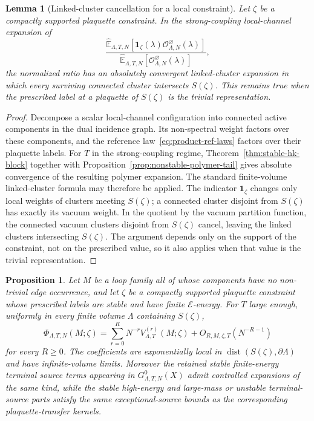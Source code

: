 \documentclass[11pt,a4paper,reqno]{amsart}
\newtheorem{lemma}[theorem]{Lemma}
\newtheorem{proposition}[theorem]{Proposition}
\theoremstyle{definition}
\theoremstyle{remark}
\newcommand\E{{\mathbb E}}
\begin{document}
\begin{lemma}[Linked-cluster cancellation for a local constraint]\label{lem:constraint-component-cancellation}
Let $\zeta$ be a compactly supported plaquette constraint. In the strong-coupling local-channel expansion of
\[
\frac{\widehat\E_{\Lambda,T,N}[\mathbf 1_\zeta(\lambda)\mathcal O^\varnothing_{\Lambda,N}(\lambda)]}
{\widehat\E_{\Lambda,T,N}[\mathcal O^\varnothing_{\Lambda,N}(\lambda)]},
\]
the normalized ratio has an absolutely convergent linked-cluster expansion in which every surviving connected cluster intersects $S(\zeta)$. This remains true when the prescribed label at a plaquette of $S(\zeta)$ is the trivial representation.
\end{lemma}

\begin{proof}
Decompose a scalar local-channel configuration into connected active components in the dual incidence graph. Its non-spectral weight factors over these components, and the reference law~\eqref{eq:product-ref-laws} factors over their plaquette labels. For $T$ in the strong-coupling regime, Theorem~\ref{thm:stable-hk-block} together with Proposition~\ref{prop:nonstable-polymer-tail} gives absolute convergence of the resulting polymer expansion. The standard finite-volume linked-cluster formula may therefore be applied. The indicator $\mathbf 1_\zeta$ changes only local weights of clusters meeting $S(\zeta)$; a connected cluster disjoint from $S(\zeta)$ has exactly its vacuum weight. In the quotient by the vacuum partition function, the connected vacuum clusters disjoint from $S(\zeta)$ cancel, leaving the linked clusters intersecting $S(\zeta)$. The argument depends only on the support of the constraint, not on the prescribed value, so it also applies when that value is the trivial representation.
\end{proof}

\begin{proposition}\label{prop:decorated-terminal-sources}
Let $M$ be a loop family all of whose components have no non-trivial edge occurrence, and let $\zeta$ be a compactly supported plaquette constraint whose prescribed labels are stable and have finite $\mathcal E$-energy.  For $T$ large enough, uniformly in every finite volume $\Lambda$ containing $S(\zeta)$,
\begin{equation}\label{eq:decorated-terminal-expansion}
\Phi_{\Lambda,T,N}(M;\zeta)
=
\sum_{r=0}^R N^{-r} V^{(r)}_{\Lambda,T}(M;\zeta)
+
O_{R,M,\zeta,T}(N^{-R-1})
\end{equation}
for every $R\ge0$.  The coefficients are exponentially local in $\operatorname{dist}(S(\zeta),\partial\Lambda)$ and have infinite-volume limits.  Moreover the retained stable finite-energy terminal source terms appearing in $G^0_{\Lambda,T,N}(X)$ admit controlled expansions of the same kind, while the stable high-energy and large-mass or unstable terminal-source parts satisfy the same exceptional-source bounds as the corresponding plaquette-transfer kernels.
\end{proposition}
\end{document}
